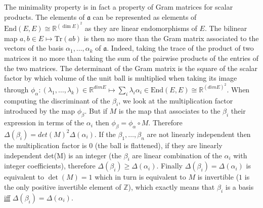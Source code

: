 \documentclass[12pt]{article}
\begin{document}
The minimality property is in fact a property of Gram matrices for scalar products. The elements of $\mathfrak a$ can be represented as elements of $\mathrm{End}(E,E)\cong{\mathbb R}^{(\dim E)^2}$ as they are linear endomorphisms of $E$. The bilinear map $a,b\in E \mapsto \mathrm{Tr}(ab)$ is then no more than the Gram matrix associated to the vectors of the basis $\alpha_1,\ldots,\alpha_k$ of $\mathfrak a$. Indeed, taking the trace of the product of two matrices it no more than taking the sum of the pairwise products of the entries of the two matrices.
 The determinant of the Gram matrix is the square of the scalar factor by which volume of the unit ball is multiplied when taking its image through $\phi_\alpha: (\lambda_1,\ldots,\lambda_k)\in {\mathbb R}^{dim E} \mapsto \sum_i{\lambda_i \alpha_i}\in \mathrm{End}(E,E)\cong{\mathbb R}^{(dim E)^2}$.
 When computing the discriminant of the $\beta_i$, we look at the multiplication factor introduced by the map $\phi_\beta$. But if $M$ is the map that associates to the $\beta_i$ their expression in terms of the $\alpha_i$ then $\phi_\beta=\phi_\alpha\circ M$.
 Therefore $\Delta(\beta_i)=det(M)^2 \Delta(\alpha_i)$. If the $\beta_1,\ldots,\beta_n$ are not linearly independent then the multiplication factor is $0$ (the ball is flattened), if they are linearly independent det(M) is an integer (the $\beta_i$ are linear combination of the $\alpha_i$ with integer coefficients), therefore $\Delta(\beta_i) \ge \Delta(\alpha_i)$. Finally $\Delta(\beta_i)=\Delta(\alpha_i)$ is equivalent to $\det(M)=1$ which in turn is equivalent to $M$ is invertible ($1$ is the only positive invertible element of $\mathbb Z$), which exactly means that $\beta_i$ is a basis \underline{iff} $\Delta(\beta_i)=\Delta(\alpha_i)$.
\end{document}
